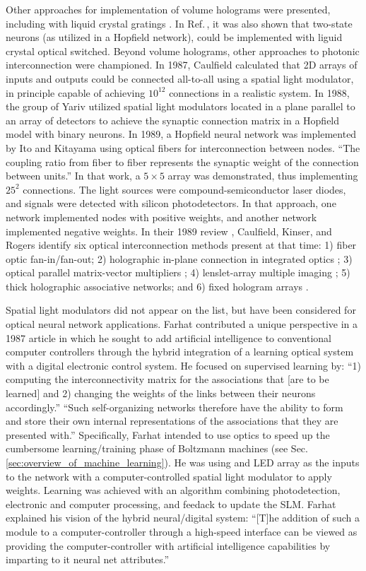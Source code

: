 Other approaches for implementation of volume holograms were presented, including with liquid crystal gratings \cite{jaju1988}. In Ref.\,\cite{jaju1988}, it was also shown that two-state neurons (as utilized in a Hopfield network), could be implemented with liguid crystal optical switched. Beyond volume holograms, other approaches to photonic interconnection were championed. In 1987, Caulfield calculated that 2D arrays of inputs and outputs could be connected all-to-all using a spatial light modulator, in principle capable of achieving $10^{12}$ connections in a realistic system. In 1988, the group of Yariv utilized spatial light modulators located in a plane parallel to an array of detectors to achieve the synaptic connection matrix \cite{agne1988} in a Hopfield model with binary neurons. In 1989, a Hopfield neural network was implemented by Ito and Kitayama using optical fibers for interconnection between nodes. ``The coupling ratio from fiber to fiber represents the synaptic weight of the connection between units.'' In that work, a $5\times 5$ array was demonstrated, thus implementing $25^2$ connections. The light sources were compound-semiconductor laser diodes, and signals were detected with silicon photodetectors. In that approach, one network implemented nodes with positive weights, and another network implemented negative weights. In their 1989 review \cite{caki1989}, Caulfield, Kinser, and Rogers identify six optical interconnection methods present at that time: 1) fiber optic fan-in/fan-out; 2) holographic in-plane connection in integrated optics \cite{fees1988}; 3) optical parallel matrix-vector multipliers \cite{faps1985}; 4) lenslet-array multiple imaging \cite{fami1986}; 5) thick holographic associative networks; and 6) fixed hologram arrays \cite{ca1987}.

Spatial light modulators did not appear on the list, but have been considered for optical neural network applications. Farhat contributed a unique perspective in a 1987 article in which he sought to add artificial intelligence to conventional computer controllers through the hybrid integration of a learning optical system with a digital electronic control system. He focused on supervised learning by: ``1) computing the interconnectivity matrix for the associations that [are to be learned] and 2) changing the weights of the links between their neurons accordingly.'' ``Such self-organizing networks therefore have the ability to form and store their own internal representations of the associations that they are presented with.'' Specifically, Farhat intended to use optics to speed up the cumbersome learning/training phase of Boltzmann machines (see Sec.\,\ref{sec:overview_of_machine_learning}). He was using and LED array as the inputs to the network with a computer-controlled spatial light modulator to apply weights. Learning was achieved with an algorithm combining photodetection, electronic and computer processing, and feedack to update the SLM. Farhat explained his vision of the hybrid neural/digital system: ``[T]he addition of such a module to a computer-controller through a high-speed interface can be viewed as providing the computer-controller with artificial intelligence capabilities by imparting to it neural net attributes.''

